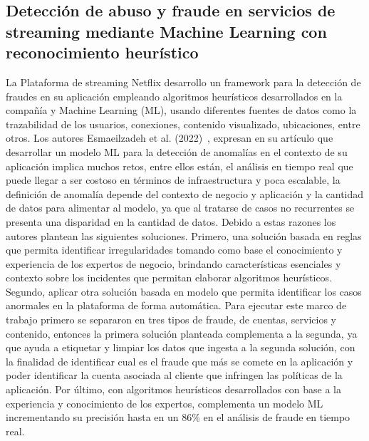 \documentclass[9pt,a4paper,twoside]{rho-class/rho}
\begin{document}
        \subsection{Detección de abuso y fraude en servicios de streaming mediante Machine Learning con reconocimiento heurístico}
        La Plataforma de streaming Netflix desarrollo un framework para la detección de fraudes en su aplicación empleando algoritmos heurísticos desarrollados en la compañía y Machine Learning (ML), usando diferentes fuentes de datos como la trazabilidad de los usuarios, conexiones, contenido visualizado, ubicaciones, entre otros. Los autores Esmaeilzadeh et al. (2022)~\cite{FraudDetection}, expresan en su artículo que desarrollar un modelo ML para la detección de anomalías en el contexto de su aplicación implica muchos retos, entre ellos están, el análisis en tiempo real que puede llegar a ser costoso en términos de infraestructura y poca escalable, la definición de anomalía depende del contexto de negocio y aplicación y la cantidad de datos para alimentar al modelo, ya que al tratarse de casos no recurrentes se presenta una disparidad en la cantidad de datos. Debido a estas razones los autores plantean las siguientes soluciones. Primero, una solución basada en reglas que permita identificar irregularidades tomando como base el conocimiento y experiencia de los expertos de negocio, brindando características esenciales y contexto sobre los incidentes que permitan elaborar algoritmos heurísticos. Segundo, aplicar otra solución basada en modelo que permita identificar los casos anormales en la plataforma de forma automática. Para ejecutar este marco de trabajo primero se separaron en tres tipos de fraude, de cuentas, servicios y contenido, entonces la primera solución planteada complementa a la segunda, ya que ayuda a etiquetar y limpiar los datos que ingesta a la segunda solución, con la finalidad de identificar cual es el fraude que más se comete en la aplicación y poder identificar la cuenta asociada al cliente que infringen las políticas de la aplicación. Por último, con algoritmos heurísticos desarrollados con base a la experiencia y conocimiento de los expertos, complementa un modelo ML incrementando su precisión hasta en un 86\% en el análisis de fraude en tiempo real.
\end{document}
